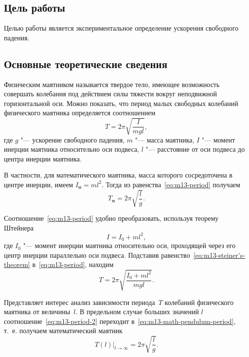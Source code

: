 \documentclass[a4paper, 12pt]{extarticle}
\begin{document}
\MTDTitlePage
\MTDInfoPage

\setcounter{section}{13}

\subsection{Цель работы}
Целью работы является экспериментальное определение ускорения свободного падения. 

\subsection{Основные теоретические сведения}
Физическим маятником называется твердое тело, имеющее возможность совершать колебания под действием силы тяжести вокруг неподвижной горизонтальной оси. Можно показать, что период малых свободных колебаний физического маятника определяется соотношением 
\begin{equation}
\label{eq:m13-period}
T = 2 \pi \sqrt{\frac{I}{mgl}},
\end{equation}
где $g$ "--- ускорение свободного падения, $m$ "--- масса маятника, $I$ "--- момент инерции маятника относительно оси подвеса, $l$ "--- расстояние от оси подвеса до центра инерции маятника.

В частности, для математического маятника, масса которого сосредоточена в центре инерции, имеем $I_\text{м} = ml^2$. Тогда из равенства~\eqref{eq:m13-period} получаем
\begin{equation}
\label{eq:m13-math-pendulum-period}
T_\text{м} = 2 \pi \sqrt{\frac{l}{g}}.
\end{equation}

Соотношение~\eqref{eq:m13-period} удобно преобразовать, используя теорему 
Штейнера
\begin{equation}
\label{eq:m13-steiner's-theorem}
I = I_0 + ml^2,
\end{equation}
где $I_0$ "--- момент инерции маятника относительно оси, проходящей через его центр инерции параллельно оси подвеса. Подставив равенство~\eqref{eq:m13-steiner's-theorem} в~\eqref{eq:m13-period}, находим
\begin{equation}
\label{eq:m13-period-2}
T = 2 \pi \sqrt{\frac{I_0 + ml^2}{mgl}}.
\end{equation}

Представляет интерес анализ зависимости периода~$T$ колебаний физического маятника от величины~$l$. В предельном случае больших значений $l$ соотношение~\eqref{eq:m13-period-2} переходит в~\eqref{eq:m13-math-pendulum-period}, т.~е. получаем математический маятник 
\begin{equation}
\label{eq:m13-period-l-to-inf}
\left. T(l) \right|_{l \to \infty} = 2 \pi \sqrt{\frac{l}{g}}. %
\end{equation}
\end{document}
